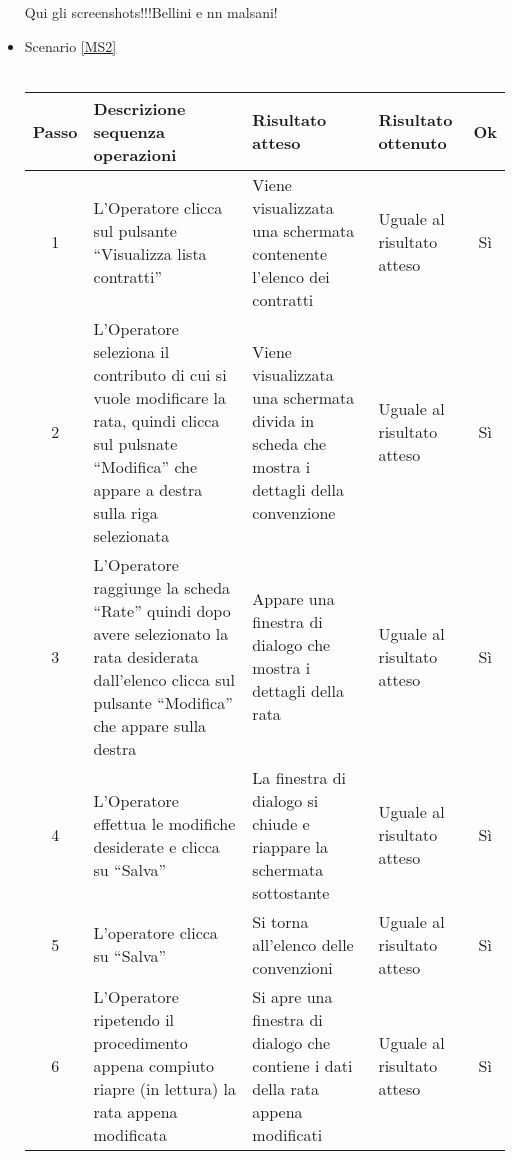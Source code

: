 \begin{itemize}
Qui gli screenshots!!!Bellini e nn malsani!

 \item Scenario \ref{MS2}\\\\
 {
 \footnotesize
  \begin{longtable}{|c|p{3cm}|p{3cm}|p{3cm}|c|}
    \hline
    Passo & Descrizione sequenza operazioni & Risultato atteso & Risultato ottenuto & Ok\\
    \hline
    1 & L'Operatore clicca sul pulsante ``Visualizza lista contratti'' & Viene visualizzata una schermata contenente l'elenco dei contratti & Uguale 
      al risultato atteso& Sì\\
    \hline
    2 & L'Operatore seleziona il contributo di cui si vuole modificare la rata, quindi clicca sul pulsnate ``Modifica'' che appare a destra sulla riga selezionata& Viene visualizzata una schermata divida in scheda che mostra i dettagli
    della convenzione& Uguale al risultato atteso & Sì\\
    \hline
    3 & L'Operatore raggiunge la scheda ``Rate'' quindi dopo avere selezionato la rata desiderata dall'elenco clicca sul pulsante ``Modifica'' che appare sulla destra& Appare una finestra di dialogo che mostra i dettagli della rata & Uguale al risultato atteso & Sì\\
    \hline
    4 & L'Operatore effettua le modifiche desiderate e clicca su ``Salva'' & La finestra di dialogo si chiude e riappare la schermata sottostante & Uguale al risultato atteso& Sì\\
    \hline
    5 & L'operatore clicca su ``Salva''& Si torna all'elenco delle convenzioni & Uguale al risultato atteso & Sì\\
    \hline
    6  & L'Operatore ripetendo il procedimento appena compiuto riapre (in lettura) la rata appena modificata & Si apre una finestra di dialogo che contiene i dati della rata appena modificati & Uguale al risultato atteso & Sì\\
    \hline
\end{longtable}
}



\end{itemize}
